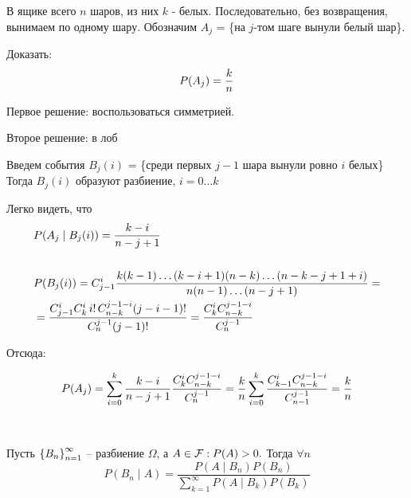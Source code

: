 \begin{example}
	В ящике всего $n$ шаров, из них $k$ - белых. Последовательно, без возвращения, вынимаем по одному шару. 
	Обозначим $A_j$ = \{на $j$-том шаге вынули белый шар\}.

	Доказать:
	\begin{equation*}
		P(A_j) = \frac{k}{n}\\
	\end{equation*}
	
	Первое решение: воспользоваться симметрией.
	
	Второе решение: в лоб

	Введем события $B_j(i)$ = \{среди первых $j - 1$ шара вынули ровно $i$  белых\}\\
	Тогда $B_j(i)$ образуют разбиение, $i = 0 \ldots k$
	
	Легко видеть, что
	\begin{align*}
		&P(A_j \mid B_j(i)) = \frac{k - i}{n - j + 1}\\\\
		&P(B_j(i)) = C_{j - 1}^{i} \frac{ k  (k - 1)  \ldots  (k - i + 1)(n - k) \ldots (n - k - j + 1 + i)}{n(n-1)\ldots (n - j + 1)} = \\
		&= \frac{C_{j - 1}^{i} C_{k}^{i}\, i!\, C_{n-k}^{j-1-i} (j - i - 1)!}{C_{n}^{j - 1} (j-1)!} = \frac{C_{k}^{i} C_{n - k}^{j - 1- i}}{C_{n}^{j - 1}}
	\end{align*}
	
	Отсюда:
	
	\begin{equation*}
		P(A_j) = \sum_{i = 0}^{k} \frac{k - i}{n - j + 1} \frac{C_{k}^{i} C_{n - k}^{j - 1- i}}{C_{n}^{j - 1}} \\
		= \frac{k}{n} \sum_{i = 0}^{k} \frac{C_{k - 1}^{i} C_{n - k}^{j - 1- i}}{C_{n - 1}^{j - 1}} = \frac{k}{n}\\\\
	\end{equation*}

\end{example}

\begin{lemma}~

	Пусть $\left\{ B_n \right\}_{n = 1}^{\infty}$ -- разбиение $\Omega$, а $A \in \mathcal{F} : P(A) > 0.$ Тогда $\forall n$
	\begin{equation*}
		P(B_n \mid A) = \frac{P(A \mid B_n) P(B_n)}{\sum_{k = 1}^{\infty} P(A \mid B_k) P(B_k)}
	\end{equation*}
\end{lemma}

